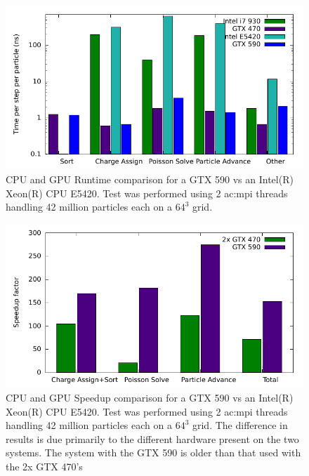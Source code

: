 \noindent \begin{figure}
\begin{center}
\includegraphics[width=6in]{performance/architecture_compare.pdf}
\end{center}
\caption[CPU and GPU Runtime comparison]{CPU and GPU Runtime comparison for a GTX 590 vs an Intel(R) Xeon(R) CPU E5420. Test was performed using 2 \gls{ac:mpi} threads handling 42 million particles each on a $64^3$ grid.}
\label{fig:speedup} 
\end{figure} 

\noindent \begin{figure}
\begin{center}
\includegraphics[width=6in]{performance/architecture_speedup_compare.pdf}
\end{center}
\caption[CPU and GPU Speedup comparison]{CPU and GPU Speedup comparison for a GTX 590 vs an Intel(R) Xeon(R) CPU E5420. Test was performed using 2 \gls{ac:mpi} threads handling 42 million particles each on a $64^3$ grid. The difference in results is due primarily to the different hardware present on the two systems. The system with the GTX 590 is older than that used with the 2x GTX 470's}
\label{fig:speedup2} 
\end{figure} 




